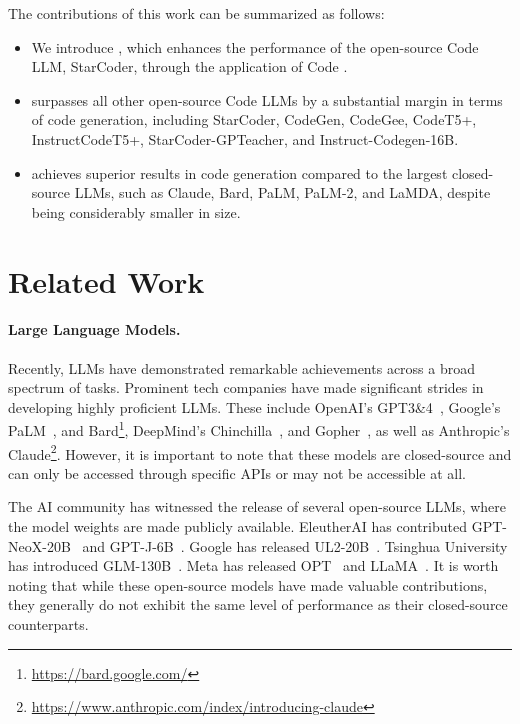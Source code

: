 The contributions of this work can be summarized as follows:
\begin{itemize}
    \item We introduce \modelname{}, which enhances the performance of the open-source Code LLM, StarCoder, through the application of Code \name{}.
    \item \modelname{} surpasses all other open-source Code LLMs by a substantial margin in terms of code generation, including StarCoder, CodeGen, CodeGee, CodeT5+, InstructCodeT5+, StarCoder-GPTeacher, and Instruct-Codegen-16B.
    \item \modelname{} achieves superior results in code generation compared to the largest closed-source LLMs, such as Claude, Bard, PaLM, PaLM-2, and LaMDA, despite being considerably smaller in size.
\end{itemize}

\section{Related Work}

\paragraph{Large Language Models.} Recently, LLMs have demonstrated remarkable achievements across a broad spectrum of tasks. Prominent tech companies have made significant strides in developing highly proficient LLMs. These include OpenAI's GPT3\&4~\cite{GPT3,GPT4}, Google's PaLM~\cite{PaLM,palm2}, and Bard\footnote{\url{https://bard.google.com/}}, DeepMind's Chinchilla~\cite{Chinchilla}, and Gopher~\cite{gopher}, as well as Anthropic's Claude\footnote{\url{https://www.anthropic.com/index/introducing-claude}}. However, it is important to note that these models are closed-source and can only be accessed through specific APIs or may not be accessible at all.

The AI community has witnessed the release of several open-source LLMs, where the model weights are made publicly available. EleutherAI has contributed GPT-NeoX-20B~\cite{GPT-NeoX-20B} and GPT-J-6B~\cite{gpt-j}. Google has released UL2-20B~\cite{UL2}. Tsinghua University has introduced GLM-130B~\cite{GLM-130B}. Meta has released OPT~\cite{opt} and LLaMA~\cite{llama}. It is worth noting that while these open-source models have made valuable contributions, they generally do not exhibit the same level of performance as their closed-source counterparts.


